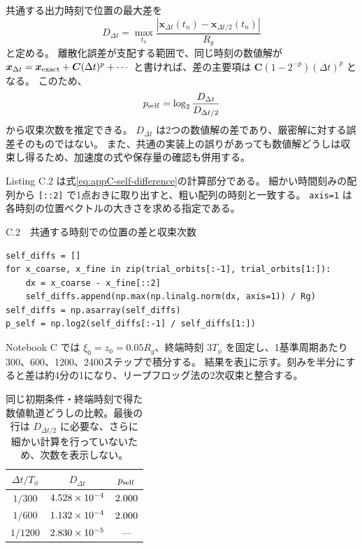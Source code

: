 共通する出力時刻で位置の最大差を
\begin{equation}
 D_{\Delta t}=\max_{t_n}\frac{|\boldsymbol x_{\Delta t}(t_n)-\boldsymbol x_{\Delta t/2}(t_n)|}{R_g}
\label{eq:appC-self-difference}
\end{equation}
と定める。
離散化誤差が支配する範囲で、同じ時刻の数値解が
$\boldsymbol x_{\Delta t}=\boldsymbol x_{\rm exact}+\boldsymbol C(\Delta t)^p+\cdots$
と書ければ、差の主要項は $\boldsymbol C(1-2^{-p})(\Delta t)^p$ となる。
このため、
\begin{equation}
 p_{\rm self}=\log_2\frac{D_{\Delta t}}{D_{\Delta t/2}}
\label{eq:appC-self-order}
\end{equation}
から収束次数を推定できる。
$D_{\Delta t}$ は2つの数値解の差であり、厳密解に対する誤差そのものではない。
また、共通の実装上の誤りがあっても数値解どうしは収束し得るため、加速度の式や保存量の確認も併用する。

Listing C.2 は式\eqref{eq:appC-self-difference}の計算部分である。
細かい時間刻みの配列から \texttt{[::2]} で1点おきに取り出すと、粗い配列の時刻と一致する。
\texttt{axis=1} は各時刻の位置ベクトルの大きさを求める指定である。

\begin{listingbox}{C.2　共通する時刻での位置の差と収束次数}
\begin{Verbatim}[fontsize=\small,xleftmargin=1mm]
self_diffs = []
for x_coarse, x_fine in zip(trial_orbits[:-1], trial_orbits[1:]):
    dx = x_coarse - x_fine[::2]
    self_diffs.append(np.max(np.linalg.norm(dx, axis=1)) / Rg)
self_diffs = np.asarray(self_diffs)
p_self = np.log2(self_diffs[:-1] / self_diffs[1:])
\end{Verbatim}
\end{listingbox}


Notebook C では $\xi_0=z_0=0.05R_g$、終端時刻 $3T_\phi$ を固定し、1基準周期あたり300、600、1200、2400ステップで積分する。
結果を表\ref{tab:appC-self-convergence}に示す。刻みを半分にすると差は約4分の1になり、リープフロッグ法の2次収束と整合する。

\begin{table}[!htbp]
\centering
\caption{同じ初期条件・終端時刻で得た数値軌道どうしの比較。最後の行は $D_{\Delta t/2}$ に必要な、さらに細かい計算を行っていないため、次数を表示しない。}
\label{tab:appC-self-convergence}
\begin{tabular}{ccc}
\toprule
$\Delta t/T_\phi$ & $D_{\Delta t}$ & $p_{\rm self}$ \\
\midrule
$1/300$ & $4.528\times 10^{-4}$ & $2.000$ \\
$1/600$ & $1.132\times 10^{-4}$ & $2.000$ \\
$1/1200$ & $2.830\times 10^{-5}$ & --- \\
\bottomrule
\end{tabular}
\end{table}

